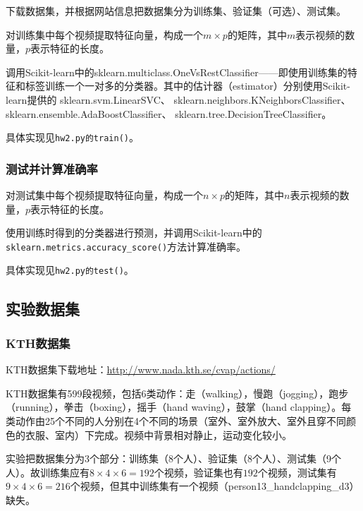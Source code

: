 \documentclass[a4paper, 12pt, UTF8]{article}
\begin{document}
下载数据集，并根据网站信息把数据集分为训练集、验证集（可选）、测试集。

对训练集中每个视频提取特征向量，构成一个$m \times p$的矩阵，其中$m$表示视频的数量，$p$表示特征的长度。

调用Scikit-learn中的sklearn.multiclass.OneVsRestClassifier\textsuperscript{\cite{ref3}}——即使用训练集的特征和标签训练一个一对多的分类器。其中的估计器（estimator）分别使用Scikit-learn提供的
sklearn.svm.LinearSVC\textsuperscript{\cite{ref4}}、
sklearn.neighbors.KNeighborsClassifier\textsuperscript{\cite{ref5}}、
sklearn.ensemble.AdaBoostClassifier\textsuperscript{\cite{ref6}}、
sklearn.tree.DecisionTreeClassifier\textsuperscript{\cite{ref7}}。

具体实现见\lstinline{hw2.py的train()}。

\subsubsection{测试并计算准确率}

对测试集中每个视频提取特征向量，构成一个$n \times p$的矩阵，其中$n$表示视频的数量，$p$表示特征的长度。

使用训练时得到的分类器进行预测，并调用Scikit-learn中的\lstinline[language=Python]{sklearn.metrics.accuracy_score()}方法\textsuperscript{\cite{ref8}}计算准确率。

具体实现见\lstinline{hw2.py的test()}。


\subsection{实验数据集}

\subsubsection{KTH数据集}

KTH数据集下载地址：\url{http://www.nada.kth.se/cvap/actions/}

KTH数据集有599段视频，包括6类动作：走（walking），慢跑（jogging），跑步（running），拳击（boxing），摇手（hand waving），鼓掌（hand clapping）。每类动作由25个不同的人分别在4个不同的场景（室外、室外放大、室外且穿不同颜色的衣服、室内）下完成。视频中背景相对静止，运动变化较小。

实验把数据集分为3个部分：训练集（8个人）、验证集（8个人）、测试集（9个人）。故训练集应有$8 \times 4 \times 6 = 192$个视频，验证集也有$192$个视频，测试集有$9 \times 4 \times 6 = 216$个视频，但其中训练集有一个视频（person13\_handclapping\_d3）缺失。
\end{document}

